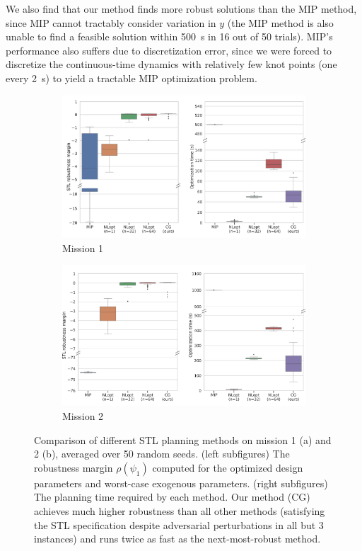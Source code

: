 We also find that our method finds more robust solutions than the MIP method, since MIP cannot tractably consider variation in $y$ (the MIP method is also unable to find a feasible solution within \SI{500}{s} in 16 out of 50 trials). MIP's performance also suffers due to discretization error, since we were forced to discretize the continuous-time dynamics with relatively few knot points (one every \SI{2}{s}) to yield a tractable MIP optimization problem.


\begin{figure}[t]
    \centering
    \begin{subfigure}[t]{0.45\linewidth}
        \centering
        \includegraphics[width=\linewidth]{images/ch5/mission_1_comparison.png}
        \caption{Mission 1}
    \end{subfigure}
    \begin{subfigure}[t]{0.45\linewidth}
        \centering
        \includegraphics[width=\linewidth]{images/ch5/mission_2_comparison.png}
        \caption{Mission 2}
    \end{subfigure}%
    \caption{Comparison of different STL planning methods on mission 1 (a) and 2 (b), averaged over 50 random seeds. (left subfigures) The robustness margin $\rho(\psi_1)$ computed for the optimized design parameters and worst-case exogenous parameters. (right subfigures) The planning time required by each method. Our method (CG) achieves much higher robustness than all other methods (satisfying the STL specification despite adversarial perturbations in all but 3 instances) and runs twice as fast as the next-most-robust method.}
    \label{ch5:fig:stl_comparisons}
\end{figure}


